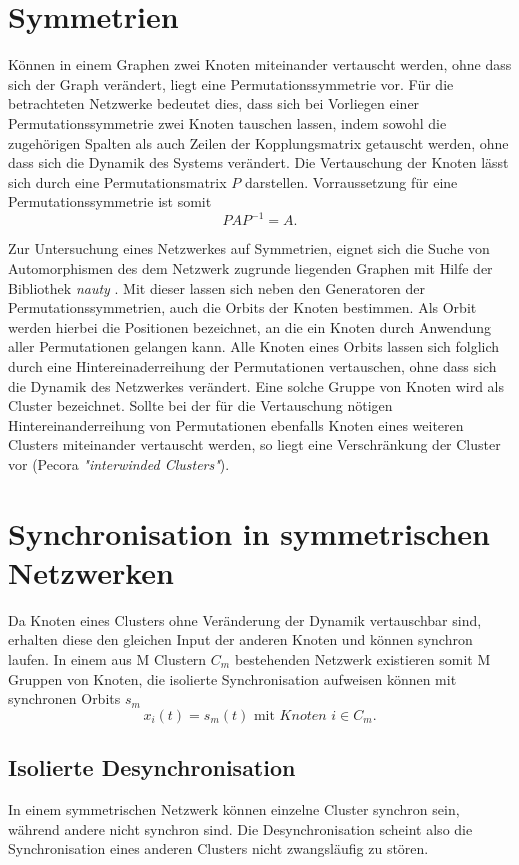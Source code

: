 \section{Symmetrien}
Können in einem Graphen zwei Knoten miteinander vertauscht werden, ohne dass sich der Graph verändert, liegt eine Permutationssymmetrie vor. Für die betrachteten Netzwerke bedeutet dies, dass sich bei Vorliegen einer Permutationssymmetrie zwei Knoten tauschen lassen, indem sowohl die zugehörigen Spalten als auch Zeilen der Kopplungsmatrix getauscht werden, ohne dass sich die Dynamik des Systems verändert. Die Vertauschung der Knoten lässt sich durch eine Permutationsmatrix $P$ darstellen. Vorraussetzung für eine Permutationssymmetrie ist somit
\begin{equation}
PAP^{-1}=A.
\end{equation}

Zur Untersuchung eines Netzwerkes auf Symmetrien, eignet sich die Suche von Automorphismen des dem Netzwerk zugrunde liegenden Graphen mit Hilfe der Bibliothek \textit{nauty} \cite{nauty}. Mit dieser lassen sich neben den Generatoren der Permutationssymmetrien, auch die Orbits der Knoten bestimmen. Als Orbit werden hierbei die Positionen bezeichnet, an die ein Knoten durch Anwendung aller Permutationen gelangen kann. Alle Knoten eines Orbits lassen sich folglich durch eine Hintereinaderreihung der Permutationen vertauschen, ohne dass sich die Dynamik des Netzwerkes verändert. Eine solche Gruppe von Knoten wird als Cluster bezeichnet. Sollte bei der für die Vertauschung nötigen Hintereinanderreihung von Permutationen ebenfalls Knoten eines weiteren Clusters miteinander vertauscht werden, so liegt eine Verschränkung der Cluster vor (Pecora\citep{pecora2014} \textit{"interwinded Clusters"}).

\section{Synchronisation in symmetrischen Netzwerken}
Da Knoten eines Clusters ohne Veränderung der Dynamik vertauschbar sind, erhalten diese den gleichen Input der anderen Knoten und können synchron laufen. In einem aus M Clustern $C_m$ bestehenden Netzwerk existieren somit M Gruppen von Knoten, die isolierte Synchronisation aufweisen können mit synchronen Orbits $s_m$
\begin{equation}
x_i(t)=s_m(t) \text{ mit } \textit{Knoten } i\in C_m.
\end{equation}

{\subsection*{Isolierte Desynchronisation}}
In einem symmetrischen Netzwerk können einzelne Cluster synchron sein, während andere nicht synchron sind. Die Desynchronisation scheint also die Synchronisation eines anderen Clusters nicht zwangsläufig zu stören.

